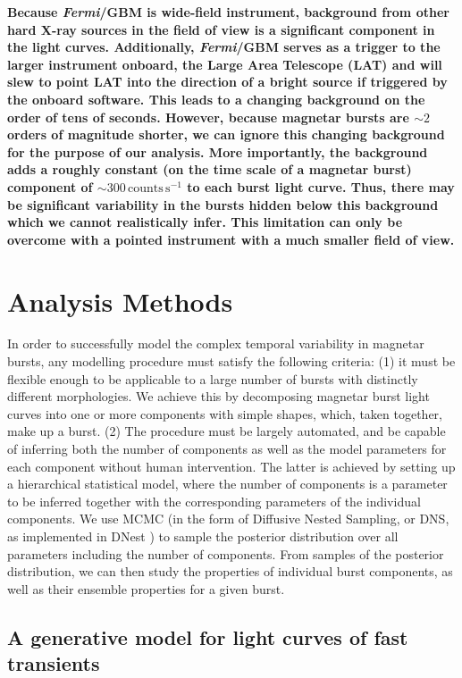 \documentclass[12pt]{emulateapj}
\newcommand{\project}[1]{\textsl{#1}}
\newcommand{\fermi}{\project{Fermi}}
\begin{document}
{\bf Because \fermi/GBM is wide-field instrument, background from other hard X-ray sources in the field of view is a significant component in the light curves. Additionally, \fermi/GBM serves as a trigger to the larger instrument onboard, the Large Area Telescope (LAT) and will slew to point LAT into the direction of a bright source if triggered by the onboard software. This leads to a changing background on the order of tens of seconds. However, because magnetar bursts are $\sim 2$ orders of magnitude shorter, we can ignore this changing background for the purpose of our analysis. More importantly, the background adds a roughly constant (on the time scale of a magnetar burst) component of $\sim 300 \,\mathrm{counts}\,\mathrm{s}^{-1}$ to each burst light curve. Thus, there may be significant variability in the bursts hidden below this background which we cannot realistically infer. This limitation can only be overcome with a pointed instrument with a much smaller field of view.}

\section{Analysis Methods}
\label{ch6:methods}
In order to successfully model the complex temporal variability in magnetar bursts, any modelling procedure must satisfy the following criteria: (1) it must be flexible enough to be applicable to a large number of bursts with distinctly different morphologies. We achieve this by decomposing magnetar burst light curves into one or more components with simple shapes, which, taken together, make up a burst. (2) The procedure must be largely automated, and be capable of inferring both the number of components as well as the model parameters for each component without human intervention. The latter is achieved by setting up a hierarchical statistical model, where the number of components is a parameter to be inferred together with the corresponding parameters of the individual components. We use MCMC (in the form of Diffusive Nested Sampling, or DNS, as implemented in DNest \citep{brewer2011}) to sample the posterior distribution over all parameters including the number of components. From samples of the posterior distribution,
we can then study the properties of individual burst components, as well as their ensemble properties for a given burst.

\subsection{A generative model for light curves of fast transients}
\label{ch6:model}
\end{document}
